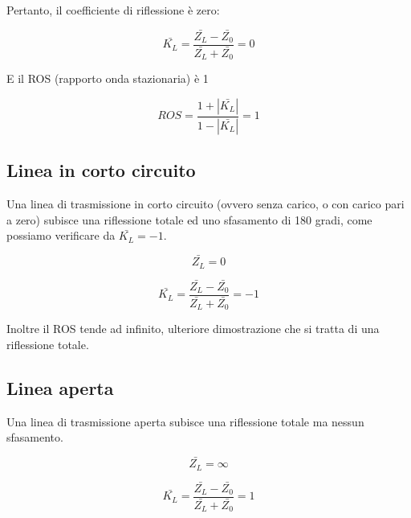 \documentclass{article}
\begin{document}
    Pertanto, il coefficiente di riflessione è zero:

    \begin{equation}
        \bar{K_L} = \frac{
            \bar{Z_L} - \bar{Z_0}
        }{
            \bar{Z_L} + \bar{Z_0}
        } = 0
    \end{equation}

    E il ROS (rapporto onda stazionaria) è 1

    \begin{equation}
        ROS = \frac{
            1 + |\bar{K_L}|
        }{
            1 - |\bar{K_L}|
        } = 1
    \end{equation}

    \subsection{Linea in corto circuito}

    Una linea di trasmissione in corto circuito (ovvero senza carico, o con carico pari a zero) subisce una riflessione
    totale ed uno sfasamento di 180 gradi, come possiamo verificare da $\bar{K_L} = -1$.

    \begin{equation}
        \bar{Z_L} = 0
    \end{equation}

    \begin{equation}
        \bar{K_L} = \frac{
            \bar{Z_L} - \bar{Z_0}
        }{
            \bar{Z_L} + \bar{Z_0}
        } = -1
    \end{equation}

    Inoltre il ROS tende ad infinito, ulteriore dimostrazione che si tratta di una riflessione totale.

    \subsection{Linea aperta}

    Una linea di trasmissione aperta subisce una riflessione totale ma nessun sfasamento.

    \begin{equation}
        \bar{Z_L} = \infty
    \end{equation}

    \begin{equation}
        \bar{K_L} = \frac{
            \bar{Z_L} - \bar{Z_0}
        }{
            \bar{Z_L} + \bar{Z_0}
        } = 1
    \end{equation}
\end{document}
